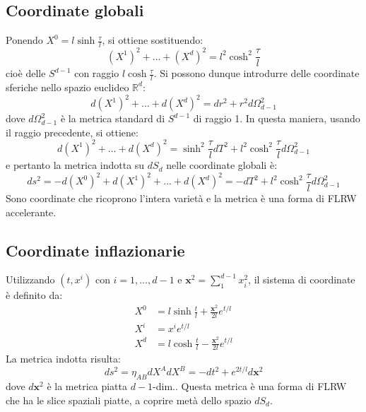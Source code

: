 \subsection{Coordinate globali}
Ponendo $X^0 = l\sinh{\frac{\tau}{l}}$, si ottiene sostituendo:
\begin{equation*}
    (X^1)^2 + \dots + (X^d)^2 = l^2\cosh^2{\frac{\tau}{l}}
\end{equation*}
cioè delle $S^{d-1}$ con raggio $l\cosh{\frac{\tau}{l}}$. Si possono dunque introdurre delle coordinate sferiche nello spazio euclideo $\mathbb{R}^d$:
\begin{equation*}
    d(X^1)^2 + \dots + d(X^d)^2 = dr^2 + r^2d\Omega_{d-1}^2
\end{equation*}
dove $d\Omega_{d-1}^2$ è la metrica standard di $S^{d-1}$ di raggio 1. In questa maniera, usando il raggio precedente, si ottiene:
\begin{equation*}
        d(X^1)^2 + \dots + d(X^d)^2 = \sinh^2{\frac{\tau}{l}}dT^2 + l^2\cosh^2{\frac{\tau}{l}}d\Omega_{d-1}^2
\end{equation*}
e pertanto la metrica indotta su $dS_d$ nelle coordinate globali è:
\begin{equation}
    ds^2 = - d(X^0)^2 + d(X^1)^2 + \dots + d(X^d)^2 = - dT^2 + l^2\cosh^2{\frac{\tau}{l}}d\Omega_{d-1}^2
    \label{eq.desitter_globali}
\end{equation}
Sono coordinate che ricoprono l'intera varietà e la metrica è una forma di FLRW accelerante.

\subsection{Coordinate inflazionarie}
Utilizzando $(t, x^i)$ con $i= 1, \dots, d-1$ e $\bm{x}^2 = \sum_1^{d-1}x_i^2$, il sistema di coordinate è definito da:
\begin{align*}
    X^0 &= l\sinh\frac{t}{l} + \frac{\bm{x}^2}{2l}e^{t/l} \\
    X^i &= x^i e^{t/l} \\
    X^d &= l\cosh\frac{t}{l} - \frac{\bm{x}^2}{2l}e^{t/l}
\end{align*}
La metrica indotta risulta:
\begin{equation}
    ds^2 = \eta_{AB}dX^A dX^B = -dt^2 + e^{2t/l}d\bm{x}^2
    \label{eq.desitter_inflazionarie}
\end{equation}
dove $d\bm{x}^2$ è la metrica piatta $d-1$-dim..
Questa metrica è una forma di FLRW che ha le slice spaziali piatte, a coprire metà dello spazio $dS_d$.

